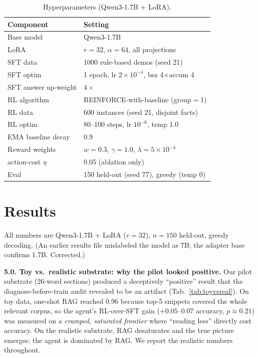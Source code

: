 \documentclass[10pt,twocolumn]{article}
\begin{document}
\begin{table}[t]
\centering\small
\caption{Hyperparameters (Qwen3-1.7B + LoRA).}
\label{tab:hp}
\begin{tabular}{ll}
\toprule
Component & Setting \\
\midrule
Base model & Qwen3-1.7B \\
LoRA & $r{=}32$, $\alpha{=}64$, all projections \\
SFT data & 1000 rule-based demos (seed 21) \\
SFT optim & 1 epoch, lr $2{\times}10^{-4}$, bsz 4$\times$accum 4 \\
SFT answer up-weight & $4\times$ \\
RL algorithm & REINFORCE-with-baseline (group$=$1) \\
RL data & 600 instances (seed 21, disjoint facts) \\
RL optim & 80--100 steps, lr $10^{-6}$, temp 1.0 \\
EMA baseline decay & 0.9 \\
Reward weights & $w{=}0.3$, $\gamma{=}1.0$, $\lambda{=}5{\times}10^{-4}$ \\
action-cost $\eta$ & 0.05 (ablation only) \\
Eval & 150 held-out (seed 77), greedy (temp 0) \\
\bottomrule
\end{tabular}
\end{table}

\section{Results}
\label{sec:results}
All numbers are Qwen3-1.7B + LoRA ($r{=}32$), $n{=}150$ held-out, greedy decoding. (An earlier results file mislabeled the model as 7B; the adapter base confirms 1.7B. Corrected.)

\textbf{5.0. Toy vs.\ realistic substrate: why the pilot looked positive.}
Our pilot substrate (26-word sections) produced a deceptively ``positive'' result that the diagnose-before-train audit revealed to be an artifact (Tab.~\ref{tab:toyvsreal}). On toy data, one-shot RAG reached 0.96 because top-5 snippets covered the whole relevant corpus, so the agent's RL-over-SFT gain ($+0.05$--$0.07$ accuracy, $p{\approx}0.21$) was measured on a \emph{cramped, saturated frontier} where ``reading less'' directly cost accuracy. On the realistic substrate, RAG desaturates and the true picture emerges: the agent is dominated by RAG. We report the realistic numbers throughout.
\end{document}
